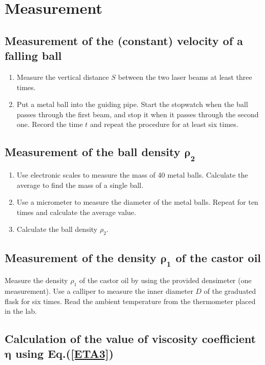 \documentclass{article}
\begin{document}
\section{Measurement}

\subsection{Measurement of the (constant) velocity of a falling ball}
\begin{enumerate}[(1)]
	\item
	Measure the vertical distance $S$ between the two laser beams at least three times.
	\item
	Put a metal ball into the guiding pipe. Start the stopwatch when the ball passes through the first beam, and stop it when it passes through the second one. Record the time $t$ and repeat the procedure for at least six times.
\end{enumerate}

\subsection{Measurement of the ball density $\bm{\rho_2}$}
\begin{enumerate}[(1)]
	\item
	Use electronic  scales  to measure the  mass of 40   metal balls. Calculate  the average to find the mass of a single ball.
	\item
	Use a micrometer to measure the diameter of the metal balls. Repeat for ten times and calculate the average  value.
	\item
	Calculate the ball density $\rho_2$.
\end{enumerate}

\subsection{Measurement of the density $\bm{\rho_1}$ of the castor oil}
\indent

Measure the density $\rho_1$ of the castor oil by using the provided densimeter (one measurement). Use a calliper to measure the inner diameter $D$ of the graduated flask for six times. Read the ambient temperature from the thermometer placed in the lab.

\subsection{Calculation of the value of viscosity coefficient $\bm{\eta}$ using Eq.(\ref{ETA3})}
\end{document}

